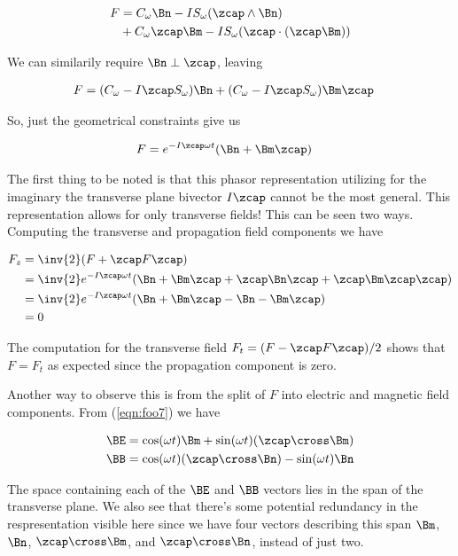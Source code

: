 \begin{align*}
F &= 
 C_\omega \Bn - I S_\omega (\zcap \wedge \Bn)  \\
&+ C_\omega \zcap \Bm - I S_\omega (\zcap \cdot (\zcap \Bm)) \\
\end{align*}

We can similarily require $\Bn \perp \zcap$, leaving

\begin{align}\label{eqn:foo7}
F &= (C_\omega - I \zcap S_\omega ) \Bn  + (C_\omega - I \zcap S_\omega) \Bm \zcap
\end{align}

So, just the geometrical constraints give us

\begin{align}\label{eqn:foo6}
F &= e^{-I\zcap \omega t}(\Bn + \Bm \zcap)
\end{align}

The first thing to be noted is that this phasor representation utilizing for the imaginary the transverse plane bivector $I\zcap$ cannot be the most general.  This representation allows for only transverse fields!  This can be seen two ways.  Computing the transverse and propagation field components we have

\begin{align*}
F_z 
&= \inv{2}(F + \zcap F \zcap) \\
&= 
\inv{2} e^{-I\zcap \omega t}( \Bn + \Bm \zcap + \zcap \Bn \zcap + \zcap \Bm \zcap \zcap) \\
&= 
\inv{2} e^{-I\zcap \omega t}( \Bn + \Bm \zcap - \Bn - \Bm \zcap ) \\
&= 0
\end{align*}

The computation for the transverse field $F_t = (F - \zcap F \zcap)/2$ shows that $F = F_t$ as expected since the propagation component is zero.

Another way to observe this is from the split of $F$ into electric and magnetic field components.  From (\ref{eqn:foo7}) we have

\begin{align}\label{eqn:foo8}
\BE &= \cos(\omega t) \Bm + \sin(\omega t) (\zcap \cross \Bm) \\
\BB &= \cos(\omega t) (\zcap \cross \Bn) - \sin(\omega t) \Bn
\end{align}

The space containing each of the $\BE$ and $\BB$ vectors lies in the span of the transverse plane.  We also see that there's some potential redundancy in the respresentation visible here since we have four vectors describing this span $\Bm$, $\Bn$, $\zcap \cross \Bm$, and $\zcap \cross \Bn$, instead of just two.

